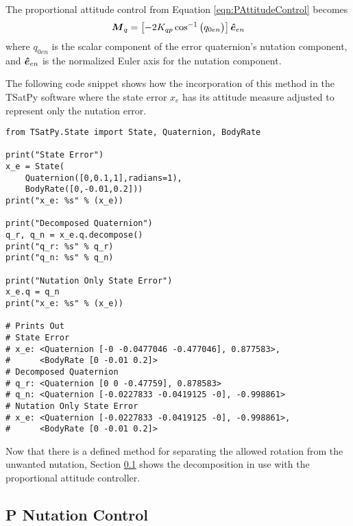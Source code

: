 The proportional attitude control from Equation \ref{eqn:PAttitudeControl} becomes
\begin{equation}
  \boldsymbol{M}_{q} = \left[-2 K_{qp} \cos^{-1} \big(q_{0en} \big) \right] \boldsymbol{\hat{e}}_{en} \\
\end{equation}
where $q_{0en}$ is the scalar component of the error quaternion's nutation component, and $\boldsymbol{\hat{e}}_{en}$ is the normalized Euler axis for the nutation component.

The following code snippet shows how the incorporation of this method in the TSatPy software where the state error $x_e$ has its attitude measure adjusted to represent only the nutation error.

\begin{singlespace}
  \begin{verbatim}
from TSatPy.State import State, Quaternion, BodyRate

print("State Error")
x_e = State(
    Quaternion([0,0.1,1],radians=1),
    BodyRate([0,-0.01,0.2]))
print("x_e: %s" % (x_e))

print("Decomposed Quaternion")
q_r, q_n = x_e.q.decompose()
print("q_r: %s" % q_r)
print("q_n: %s" % q_n)

print("Nutation Only State Error")
x_e.q = q_n
print("x_e: %s" % (x_e))

# Prints Out
# State Error
# x_e: <Quaternion [-0 -0.0477046 -0.477046], 0.877583>,
#      <BodyRate [0 -0.01 0.2]>
# Decomposed Quaternion
# q_r: <Quaternion [0 0 -0.47759], 0.878583>
# q_n: <Quaternion [-0.0227833 -0.0419125 -0], -0.998861>
# Nutation Only State Error
# x_e: <Quaternion [-0.0227833 -0.0419125 -0], -0.998861>,
#      <BodyRate [0 -0.01 0.2]>
  \end{verbatim}
\nocite{minted}
\end{singlespace}

Now that there is a defined method for separating the allowed rotation from the unwanted nutation, Section \ref{subsec:PNutationControl} shows the decomposition in use with the proportional attitude controller.

\subsection{P Nutation Control}
\label{subsec:PNutationControl}

